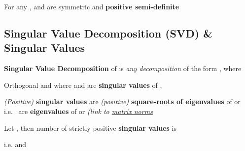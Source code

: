\hSep %

For any ,  and
 are symmetric and \textbf{positive semi-definite}

\subsection*{Singular Value Decomposition (SVD) \& Singular Values}


\textbf{Singular Value Decomposition} of
 is \emph{any decomposition} of
the form , where

\begin{itemize}

      \vItem
            Orthogonal 
            and 
      \vItem
            where  and
            \tcbbreak
      \vItem
             are \textbf{singular values}
            of ,

            \begin{itemize}

                  \vItem
                        \emph{(Positive)} \textbf{singular values} are \emph{(positive)}
                        \textbf{square-roots of eigenvalues} of  or
                  \vItem
                        i.e.~ are
                        \textbf{eigenvalues} of  or 
                  \vItem
                         \emph{(link to
                              \ul{matrix norms}}
            \end{itemize}
\end{itemize}

Let , then number of strictly positive
\textbf{singular values} is 

\begin{itemize}

      \vItem
            i.e.  and
      \vItem
\end{itemize}


